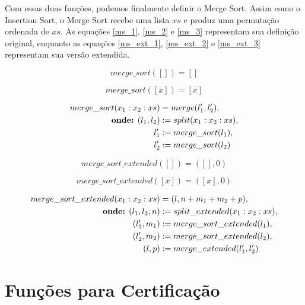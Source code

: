 \documentclass[12pt, oneside, a4paper,english,brazil]{abntex2}
\begin{document}
\qquad Com essas duas fun\c{c}\~oes, podemos finalmente definir o Merge Sort. Assim como o Insertion
Sort, o Merge Sort recebe uma lista $xs$ e produz uma permuta\c{c}\~ao ordenada de $xs$. As
equa\c{c}\~oes \ref{ms_1}, \ref{ms_2} e \ref{ms_3} representam sua defini\c{c}\~ao original,
enquanto as equa\c{c}\~oes \ref{ms_ext_1}, \ref{ms_ext_2} e \ref{ms_ext_3} representam
sua vers\~ao extendida.

\begin{equation}\label{ms_1}
merge\_sort([]) = []
\end{equation}

\begin{equation}\label{ms_2}
merge\_sort([x]) = [x]
\end{equation}

\begin{equation}\label{ms_3}
\begin{split}
  merge\_sort(x_{1} : x_{2} : xs) &= merge(l_{1}', l_{2}'),\\
  \text{\textbf{onde:} } (l_{1}, l_{2}) &:= split(x_{1} : x_{2} : xs),\\
  l_{1}' &:= merge\_sort(l_{1}),\\
  l_{2}' &:= merge\_sort(l_{2})
\end{split}
\end{equation}

\begin{equation}\label{ms_ext_1}
merge\_sort\_extended([]) = ([], 0)
\end{equation}

\begin{equation}\label{ms_ext_2}
merge\_sort\_extended([x]) = ([x], 0)
\end{equation}

\begin{equation}\label{ms_ext_3}
\begin{split}
  merge\_sort\_extended(x_{1} : x_{2} : xs) &= (l, n + m_{1} + m_{2} + p),\\
  \text{\textbf{onde:} } (l_{1}, l_{2}, n) &:= split\_extended(x_{1} : x_{2} : xs),\\
  (l_{1}', m_{1}) &:= merge\_sort\_extended(l_{1}),\\
  (l_{2}', m_{2}) &:= merge\_sort\_extended(l_{2}),\\
  (l, p) &:= merge\_extended(l_{1}', l_{2}')
\end{split}
\end{equation}

\section{Fun\c{c}\~oes para Certifica\c{c}\~ao}
\end{document}
